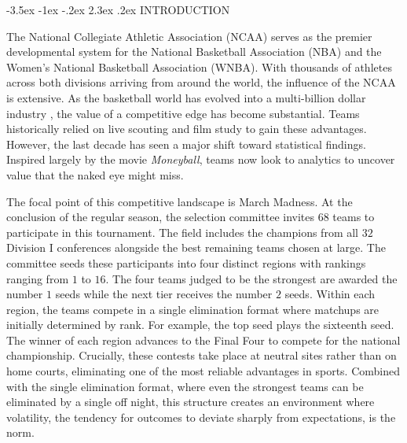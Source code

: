 \documentclass[12pt,leqno]{article}\usepackage[pdftex]{graphicx}\usepackage[dvipsnames]{xcolor}
\makeatletter
\renewcommand\section{\@startsection {section}{1}{\z@}%
{-3.5ex \@plus -1ex \@minus -.2ex}%
{2.3ex \@plus.2ex}%
{\normalfont\centering}}
\theoremstyle{remark}
\makeatother
\begin{document}
\doublespacing%

\begin{center}
\section{INTRODUCTION}
\end{center}
\setcounter{page}{1}%
\thispagestyle{empty} %

The National Collegiate Athletic Association (NCAA) serves as the premier developmental system for the National Basketball Association (NBA) and the Women's National Basketball Association (WNBA). With thousands of athletes across both divisions arriving from around the world, the influence of the NCAA is extensive. As the basketball world has evolved into a multi-billion dollar industry \cite{Berkowitz2025}, the value of a competitive edge has become substantial. Teams historically relied on live scouting and film study to gain these advantages. However, the last decade has seen a major shift toward statistical findings. Inspired largely by the movie \textit{Moneyball}, teams now look to analytics to uncover value that the naked eye might miss.

The focal point of this competitive landscape is March Madness. At the conclusion of the regular season, the selection committee invites $68$ teams to participate in this tournament. The field includes the champions from all $32$ Division I conferences alongside the best remaining teams chosen at large. The committee seeds these participants into four distinct regions with rankings ranging from $1$ to $16$. The four teams judged to be the strongest are awarded the number $1$ seeds while the next tier receives the number $2$ seeds. Within each region, the teams compete in a single elimination format where matchups are initially determined by rank. For example, the top seed plays the sixteenth seed. The winner of each region advances to the Final Four to compete for the national championship. Crucially, these contests take place at neutral sites rather than on home courts, eliminating one of the most reliable advantages in sports. Combined with the single elimination format, where even the strongest teams can be eliminated by a single off night, this structure creates an environment where volatility, the tendency for outcomes to deviate sharply from expectations, is the norm.
\end{document}
